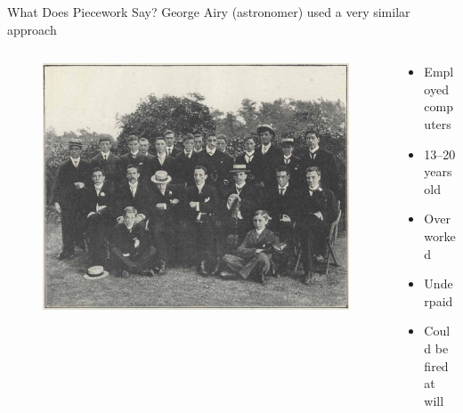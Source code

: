 \documentclass[presentation]{subfiles}
\begin{document}
\begin{frame}{What Does Piecework Say?}
      George Airy (astronomer) used a very similar approach\\
      \scriptsize{\textcite{grier2013computers}}
    \begin{columns}
    \begin{column}{0.6\textwidth}
      \begin{figure}
        \includegraphics[width=\textwidth]{figures/photo/Greenwich-Observatory-computing-staff-1902.jpg}
      \end{figure}
    \end{column}
    
    \begin{column}{0.4\textwidth}
      \begin{itemize}
        \item Employed computers
        \item 13--20 years old
        \item Overworked
        \item Underpaid
        \item Could be fired at will
      \end{itemize}
    \end{column}
    \end{columns}

\end{frame}
\end{document}
